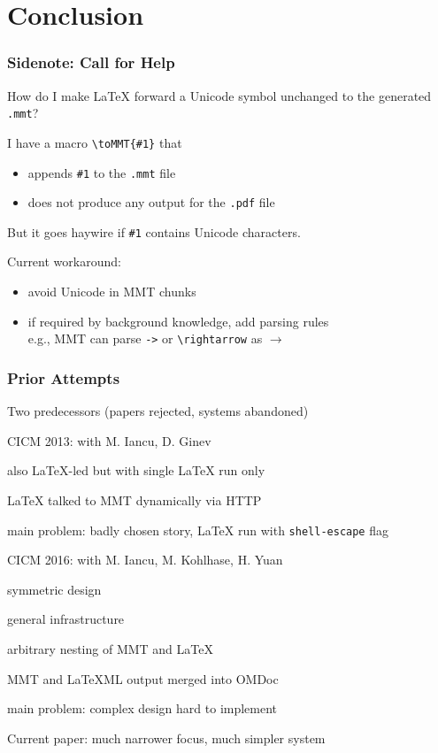 \section{Conclusion}


\begin{frame}[fragile]\frametitle{Sidenote: Call for Help}
How do I make LaTeX forward a Unicode symbol unchanged to the generated \texttt{.mmt}?
\bigskip

I have a macro \verb|\toMMT{#1}| that
\begin{itemize}
 \item appends \verb|#1| to the \texttt{.mmt} file
 \item does not produce any output for the \texttt{.pdf} file
\end{itemize}

But it goes haywire if \verb|#1| contains Unicode characters.
\bigskip

Current workaround:
\begin{itemize}
\item avoid Unicode in MMT chunks
\item if required by background knowledge, add parsing rules\\
 e.g., MMT can parse \verb|->| or \verb|\rightarrow| as $\rightarrow$
\end{itemize}
\end{frame}

\begin{frame}\frametitle{Prior Attempts}
Two predecessors (papers rejected, systems abandoned)
\begin{blockitems}{CICM 2013: with M. Iancu, D. Ginev}
  \item also LaTeX-led but with single LaTeX run only
  \item LaTeX talked to MMT dynamically via HTTP
  \item main problem: badly chosen story, LaTeX run with \texttt{shell-escape} flag
\end{blockitems}

\begin{blockitems}{CICM 2016: with M. Iancu, M. Kohlhase, H. Yuan}
  \item symmetric design
  \item general infrastructure
  \item arbitrary nesting of MMT and LaTeX
  \item MMT and LaTeXML output merged into OMDoc
  \item main problem: complex design hard to implement
\end{blockitems}
Current paper: much narrower focus, much simpler system
\end{frame}


